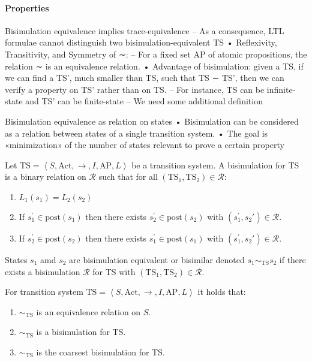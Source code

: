 \paragraph*{Properties}
Bisimulation equivalence implies trace-equivalence
– As a consequence, LTL formulae cannot distinguish two bisimulation-equivalent TS
• Reflexivity, Transitivity, and Symmetry of ∼:
– For a fixed set AP of atomic propositions, the relation ∼ is an equivalence
relation.
• Advantage of bisimulation: given a TS, if we can find a TS', much smaller
than TS, such that TS ∼ TS', then we can verify a property on TS' rather
than on TS.
– For instance, TS can be infinite-state and TS' can be finite-state
– We need some additional definition

Bisimulation equivalence as relation on states
• Bisimulation can be considered as a relation between states of a single
transition system.
• The goal is «minimization» of the number of states relevant to prove a
certain property
\begin{definition}
    Let $\text{TS}=\left\langle S,\text{Act},\rightarrow,I,\text{AP},L\right\rangle$ be a transition system. 
    A bisimulation for TS is a binary relation on $\mathcal{R}$ such that for all $(\text{TS}_1,\text{TS}_2)\in\mathcal{R}$: 
    \begin{enumerate}
        \item $L_1(s_1)=L_2(s_2)$
        \item If $s_1^\prime\in\text{post}(s_1)$ then there exists $s_2^\prime\in\text{post}(s_2)$ with $(s_1^\prime,s_2\prime)\in\mathcal{R}$. 
        \item If $s_2^\prime\in\text{post}(s_2)$ then there exists $s_1^\prime\in\text{post}(s_1)$ with $(s_1^\prime,s_2\prime)\in\mathcal{R}$. 
    \end{enumerate}
    States $s_1$ amd $s_2$ are bisimulation equivalent or bisimilar denoted $s_1\sim_{\text{TS}}s_2$ if there exists a bisimulation $\mathcal{R}$ for TS with $(\text{TS}_1,\text{TS}_2)\in\mathcal{R}$. 
\end{definition}
\noindent For transition system $\text{TS}=\left\langle S,\text{Act},\rightarrow,I,\text{AP},L\right\rangle$ it holds that: 
\begin{enumerate}
    \item $\sim_{\text{TS}}$ is an equivalence relation on $S$.
    \item $\sim_{\text{TS}}$ is a bisimulation for TS. 
    \item $\sim_{\text{TS}}$ is the coarsest bisimulation for TS. 
\end{enumerate}

